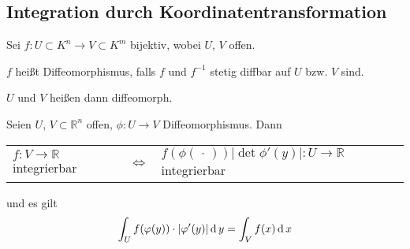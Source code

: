 \subsection{Integration durch Koordinatentransformation}
\begin{*definition}
Sei $f:U\subset K^n\to V\subset K^m$ bijektiv, wobei $U$, $V$ offen.

$f$ heißt Diffeomorphismus, falls $f$ und $f^{-1}$ stetig diffbar auf $U$ bzw. $V$ sind.

$U$ und $V$ heißen dann diffeomorph.
\end{*definition}

\begin{theorem}[Transformationssatz]
	Seien $U$, $V\subset\mathbb{R}^n$ offen, $\phi: U\to V$ Diffeomorphismus. Dann 
	
	\begin{tabularx}{\linewidth}{X@{\ \ }c@{\ \ }X}
		\hfill$f:V\to\mathbb{R}$ integrierbar  & $\Leftrightarrow$ & $f(\phi(\,\cdot\,))\vert \det \phi'(y) \vert: U\to\mathbb{R}$ integrierbar
	\end{tabularx}
	und es gilt
	\begin{align}
		\int_U f(\varphi(y))\cdot\vert\varphi'(y)\vert \operatorname{d} y = \int_V f(x) \operatorname{d} x\notag
	\end{align}
\end{theorem}

